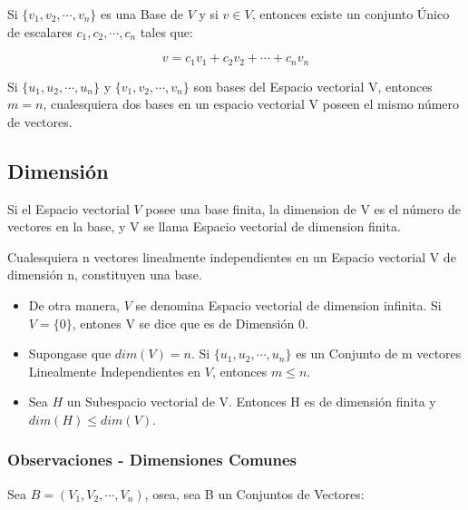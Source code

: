 \documentclass[12pt]{report}							    %
\begin{document}
        Si $\{ v_1, v_2,\cdots, v_n\}$ es una Base de $V$ y si $v \in V$, entonces
        existe un conjunto Único de escalares $c_1, c_2, \cdots, c_n$ tales que:

        \begin{equation}
            v = c_1v_1 + c_2v_2 + \cdots + c_nv_n
        \end{equation}

        Si $\{u_1, u_2, \cdots, u_n\}$ y $\{v_1, v_2, \cdots, v_n\}$ son bases del
        Espacio vectorial V, entonces $m = n$, cualesquiera dos bases en un espacio
        vectorial V poseen el mismo número de vectores.

        \subsection{Dimensión}
        Si el Espacio vectorial $V$ posee una base finita, la dimension de V es el 
        número de vectores en la base, y V se llama Espacio vectorial de dimension finita.

        Cualesquiera n vectores linealmente independientes en un Espacio
        vectorial V de dimensión n, constituyen una base.

        \begin{itemize}
            \item De otra manera, $V$ se denomina Espacio vectorial de dimension infinita.
            Si $V=\{0\}$, entones V se dice que es de Dimensión 0.

            \item Supongase que $dim(V) = n$. Si $\{u_1, u_2, \cdots, u_n\}$ es un Conjunto de m vectores
            Linealmente Independientes en $V$, entonces $m \leq n$.

            \item Sea $H$ un Subespacio vectorial de V. Entonces H es de dimensión finita
            y $dim(H) \leq dim(V)$.

        \end{itemize}

        \subsubsection{Observaciones - Dimensiones Comunes}

        Sea $ B = (V_1, V_2, \cdots, V_n)$, osea, sea B un Conjuntos de Vectores:
\end{document}
